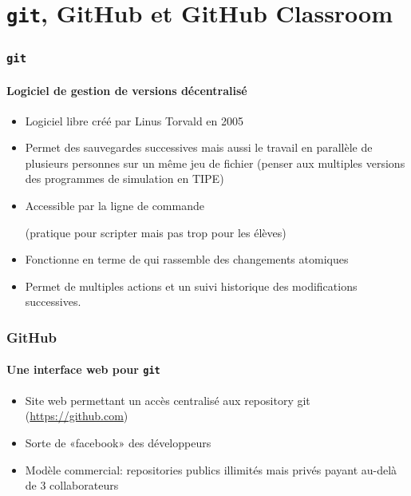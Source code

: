 \section{\texttt{git}, GitHub et GitHub Classroom}

\begin{frame}
\frametitle{\texttt{git}}
\framesubtitle{Logiciel de gestion de versions décentralisé}

\begin{itemize}[<+->]
	\item	 Logiciel libre créé par Linus Torvald en 2005
	\item  Permet des sauvegardes successives mais aussi le travail en parallèle de plusieurs personnes sur un même jeu de fichier (penser aux multiples versions des programmes de simulation en TIPE)
	\item  Accessible par la ligne de commande

	(pratique pour scripter mais pas trop pour les élèves)
	\item  Fonctionne en terme de  qui rassemble des changements atomiques
	\item 	Permet de multiples actions et un suivi historique des modifications successives.

\end{itemize}

\end{frame}


\begin{frame}
\frametitle{GitHub}
\framesubtitle{Une interface web pour \texttt{git}}

\begin{itemize}[<+->]
	\item Site web permettant un accès centralisé aux repository git (\url{https://github.com})



	\item Sorte de «facebook» des développeurs

	\item Modèle commercial: repositories publics illimités mais privés payant au-delà de 3 collaborateurs

\end{itemize}

\end{frame}


